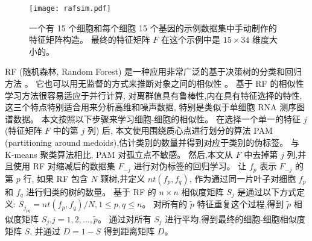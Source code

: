 \begin{figure}[!htbp]
    \centering
    \texttt{[image: rafsim.pdf]}
    \caption{
        一个有 15 个细胞和每个细胞 15 个基因的示例数据集中手动制作的特征矩阵构造。
        最终的特征矩阵 $F$ 在这个示例中是 $15\times34$ 维度大小的。
    }
    \label{fig:rafsim}
\end{figure}

RF (随机森林, Random Forest) 是一种应用非常广泛的基于决策树的分类和回归方法 。
它也可以用无监督的方式来推断对象之间的相似性 。
基于 RF 的相似性学习方法很容易适应于并行计算,
对离群值具有鲁棒性,内在具有特征选择的特性,这三个特点特别适合用来分析高维和噪声数据,
特别是类似于单细胞 RNA 测序图谱数据。
本文按照以下步骤来学习细胞-细胞的相似性。
在选择一个单一的特征 $j$ (特征矩阵 $F$ 中的第 $j$ 列) 后, 
本文使用围绕质心点进行划分的算法 PAM (partitioning around medoids),估计类别的数量并得到对应于类别的伪标签。
与 K-means 聚类算法相比, PAM 对孤立点不敏感。
然后,本文从 $F$ 中去掉第 $j$ 列,并且使用 RF 对缩减后的数据集 $F_{-j}$ 进行对伪标签的回归学习。
让 $f_p$ 表示 $F_{-j}$ 的第 $p$ 行,
如果 RF 包含 $N$ 颗树,并定义 $nt(f_p,f_q)$, 作为通过同一片叶子对细胞 $f_p$ 和 $f_q$ 进行归类的树的数量。
基于 RF 的 $n \times n$ 相似度矩阵 $S_j$ 是通过以下方式定义:
$S_{j_{pq}} = nt(f_p,f_q) / N, 1 \le p,q \le n$。
对所有的 $\tilde{p}$ 特征重复这个过程,得到 $\tilde{p}$ 相似度矩阵 $S_j$,$j=1,2,\ldots,\tilde{p}$。
通过对所有 $S_j$ 进行平均,得到最终的细胞-细胞相似度矩阵 $S$,
并通过 $D=1-S$ 得到距离矩阵 $D$。

